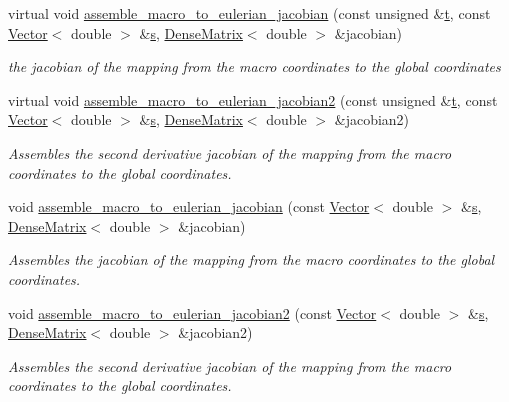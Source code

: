 \begin{DoxyCompactItemize}
virtual void \hyperlink{classoomph_1_1MacroElement_acd465f4065dee7acfbb36d307ad691f9}{assemble\+\_\+macro\+\_\+to\+\_\+eulerian\+\_\+jacobian} (const unsigned \&\hyperlink{cfortran_8h_af6f0bd3dc13317f895c91323c25c2b8f}{t}, const \hyperlink{classoomph_1_1Vector}{Vector}$<$ double $>$ \&\hyperlink{cfortran_8h_ab7123126e4885ef647dd9c6e3807a21c}{s}, \hyperlink{classoomph_1_1DenseMatrix}{Dense\+Matrix}$<$ double $>$ \&jacobian)
\begin{DoxyCompactList}\small\item\em the jacobian of the mapping from the macro coordinates to the global coordinates \end{DoxyCompactList}\item 
virtual void \hyperlink{classoomph_1_1MacroElement_a3c898b6deef9f8bfcc957313030a3e68}{assemble\+\_\+macro\+\_\+to\+\_\+eulerian\+\_\+jacobian2} (const unsigned \&\hyperlink{cfortran_8h_af6f0bd3dc13317f895c91323c25c2b8f}{t}, const \hyperlink{classoomph_1_1Vector}{Vector}$<$ double $>$ \&\hyperlink{cfortran_8h_ab7123126e4885ef647dd9c6e3807a21c}{s}, \hyperlink{classoomph_1_1DenseMatrix}{Dense\+Matrix}$<$ double $>$ \&jacobian2)
\begin{DoxyCompactList}\small\item\em Assembles the second derivative jacobian of the mapping from the macro coordinates to the global coordinates. \end{DoxyCompactList}\item 
void \hyperlink{classoomph_1_1MacroElement_a5640171931fffc8add41437596d3df20}{assemble\+\_\+macro\+\_\+to\+\_\+eulerian\+\_\+jacobian} (const \hyperlink{classoomph_1_1Vector}{Vector}$<$ double $>$ \&\hyperlink{cfortran_8h_ab7123126e4885ef647dd9c6e3807a21c}{s}, \hyperlink{classoomph_1_1DenseMatrix}{Dense\+Matrix}$<$ double $>$ \&jacobian)
\begin{DoxyCompactList}\small\item\em Assembles the jacobian of the mapping from the macro coordinates to the global coordinates. \end{DoxyCompactList}\item 
void \hyperlink{classoomph_1_1MacroElement_ae3c34b538e970d152a7f107d7ae418c8}{assemble\+\_\+macro\+\_\+to\+\_\+eulerian\+\_\+jacobian2} (const \hyperlink{classoomph_1_1Vector}{Vector}$<$ double $>$ \&\hyperlink{cfortran_8h_ab7123126e4885ef647dd9c6e3807a21c}{s}, \hyperlink{classoomph_1_1DenseMatrix}{Dense\+Matrix}$<$ double $>$ \&jacobian2)
\begin{DoxyCompactList}\small\item\em Assembles the second derivative jacobian of the mapping from the macro coordinates to the global coordinates. \end{DoxyCompactList}\item 

\end{DoxyCompactItemize}
